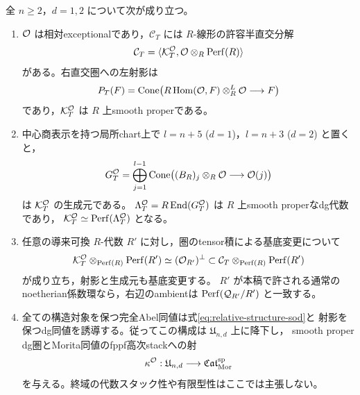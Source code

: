 \begin{theorem}
\label{thm:relative-structure-orthogonal}
全 $n\ge2$，$d=1,2$ について次が成り立つ。
\begin{enumerate}
 \item $\mathcal O$ は相対exceptionalであり，$\mathcal C_T$ には
       $R$-線形の許容半直交分解
       \begin{equation}\label{eq:relative-structure-sod}
        \mathcal C_T=\langle\mathcal K_T^{\mathcal O},\mathcal O\otimes_R\operatorname{Perf}(R)\rangle
       \end{equation}
       がある。右直交圏への左射影は
       \begin{equation}\label{eq:relative-structure-projector}
        P_T(F)=\operatorname{Cone}\bigl(
            R\operatorname{Hom}(\mathcal O,F)\otimes_R^L\mathcal O\longrightarrow F\bigr)
       \end{equation}
       であり，$\mathcal K_T^{\mathcal O}$ は $R$ 上smooth properである。
 \item 中心商表示を持つ局所chart上で
       $l=n+5$ ($d=1$)，$l=n+3$ ($d=2$) と置くと，
       \begin{equation}\label{eq:relative-structure-generator}
        G_T^{\mathcal O}=\bigoplus_{j=1}^{l-1}
        \operatorname{Cone}\bigl((B_R)_j\otimes_R\mathcal O
                                  \longrightarrow\mathcal O(j)\bigr)
       \end{equation}
       は $\mathcal K_T^{\mathcal O}$ の生成元である。
       $\Lambda_T^{\mathcal O}=R\operatorname{End}(G_T^{\mathcal O})$ は $R$ 上smooth properなdg代数であり，
       $\mathcal K_T^{\mathcal O}\simeq\operatorname{Perf}(\Lambda_T^{\mathcal O})$ となる。
 \item 任意の導来可換 $R$-代数 $R'$ に対し，圏のtensor積による基底変更について
       \begin{equation}\label{eq:relative-structure-base-change}
        \mathcal K_T^{\mathcal O}\otimes_{\operatorname{Perf}(R)}\operatorname{Perf}(R')
        \simeq (\mathcal O_{R'})^\perp
        \subset\mathcal C_T\otimes_{\operatorname{Perf}(R)}\operatorname{Perf}(R')
       \end{equation}
       が成り立ち，射影と生成元も基底変更する。
       $R'$ が本稿で許される通常のnoetherian係数環なら，右辺のambientは
       $\operatorname{Perf}(\mathcal Q_{R'}/R')$ と一致する。
 \item 全ての構造対象を保つ完全Abel同値は式\eqref{eq:relative-structure-sod}と
       射影を保つdg同値を誘導する。従ってこの構成は $\mathfrak U_{n,d}$ 上に降下し，
       smooth proper dg圏とMorita同値のfppf高次stackへの射
       \[
        \kappa^{\mathcal O}:\mathfrak U_{n,d}
          \longrightarrow\mathfrak{Cat}_{\mathrm{Mor}}^{\mathrm{sp}}
       \]
       を与える。終域の代数スタック性や有限型性はここでは主張しない。
\end{enumerate}
\end{theorem}
